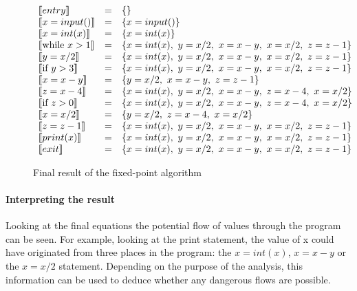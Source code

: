 \begin{figure}[H]
\[
\begin{array}{lcl}
  \llbracket entry \rrbracket & = & \{\}\\
  \llbracket x = input() \rrbracket & = & \{x = input()\}\\
  \llbracket x = int(x) \rrbracket & = & \{x = int(x)\}\\
  \llbracket \text{while } x > 1 \rrbracket & = & \{ x = int(x), ~ y = x / 2, ~ x=x-y, ~ x = x/2, ~ z=z-1 \}\\
  \llbracket  y = x / 2 \rrbracket & = & \{ x = int(x), ~ y = x / 2, ~ x=x-y, ~ x = x/2, ~ z=z-1 \}\\
  \llbracket \text{if } y > 3 \rrbracket &  = & \{ x = int(x), ~ y = x / 2, ~ x=x-y, ~ x = x/2, ~ z=z-1 \}\\
  \llbracket  x = x-y \rrbracket & = & \{ y = x / 2, ~ x=x-y, ~ z=z-1 \}\\
  \llbracket  z = x-4 \rrbracket & = & \{ x = int(x), ~ y = x / 2, ~ x=x-y, ~ z=x-4, ~ x = x/2\}\\
  \llbracket \text{if } z > 0 \rrbracket & = & \{ x = int(x), ~ y = x / 2, ~ x=x-y, ~ z=x-4, ~ x = x/2\}\\
  \llbracket x = x / 2 \rrbracket & = & \{ y = x / 2, ~ z=x-4, ~ x = x/2\}\\
  \llbracket z = z - 1 \rrbracket & = & \{ x = int(x), ~ y = x / 2, ~ x=x-y, ~ x = x/2, ~ z=z-1 \}\\
  \llbracket print(x) \rrbracket & = & \{ x = int(x), ~ y = x / 2, ~ x=x-y, ~ x = x/2, ~ z=z-1 \}\\
  \llbracket exit \rrbracket & = & \{ x = int(x), ~ y = x / 2, ~ x=x-y, ~ x = x/2, ~ z=z-1 \}\\
\end{array}
\]
\caption{Final result of the fixed-point algorithm}
\label{reachingdefinitions:finaliteration}
\end{figure}

\paragraph{Interpreting the result}

Looking at the final equations the potential flow of values through the program can be seen.
For example, looking at the print statement, the value of x could have originated from three places in the program: the $x = int(x)$, $x = x-y$ or the $x = x/2$ statement.
Depending on the purpose of the analysis, this information can be used to deduce whether any dangerous flows are possible.
